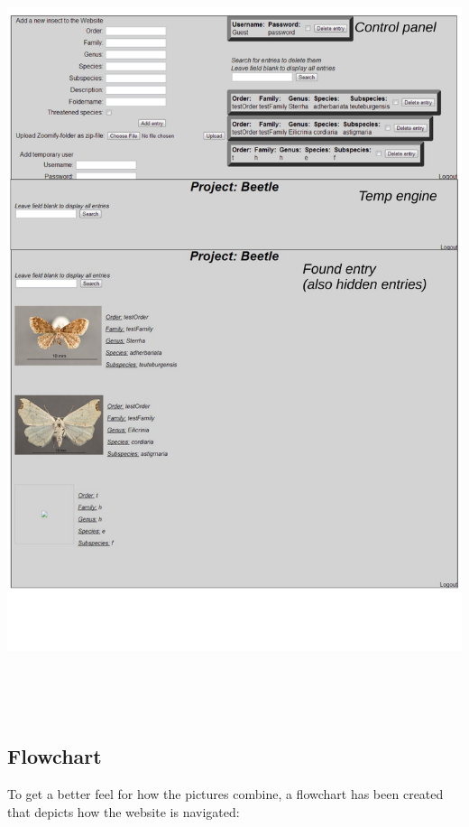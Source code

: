\documentclass[12pt,a4paper]{article}
\begin{document}
\includegraphics[height=225mm]{UI3.pdf}\\

\subsection{Flowchart}

To get a better feel for how the pictures combine, a flowchart has been created that depicts how the website is navigated:
\end{document}
